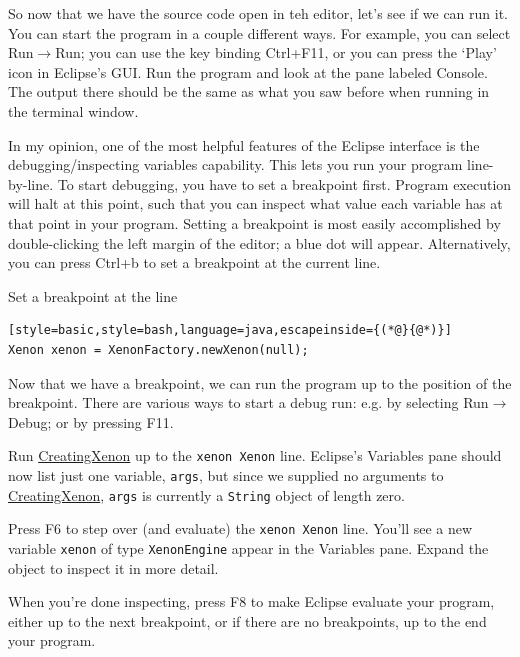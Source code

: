 \documentclass[12pt, a4paper, twoside,openany,titlepage]{article}
\begin{document}
{


So now that we have the source code open in teh editor, let's see if we can run it. You can start the program in a couple different ways. For example, you can select \textsf{Run}$\rightarrow$\textsf{Run}; you can use the key binding \textsf{Ctrl+F11}, or you can press the `Play' icon in Eclipse's GUI. Run the program and look at the pane labeled \textsf{Console}. The output there should be the same as what you saw before when running in the terminal window.


In my opinion, one of the most helpful features of the Eclipse interface is the debugging/inspecting variables capability. This lets you run your program line-by-line. To start debugging, you have to set a breakpoint first. Program execution will halt at this point, such that you can inspect what value each variable has at that point in your program. Setting a breakpoint is most easily accomplished by double-clicking the left margin of the editor; a blue dot will appear. Alternatively, you can press \textsf{Ctrl+b} to set a breakpoint at the current line.

Set a breakpoint at the line
\begin{lstlisting}[style=basic,style=bash,language=java,escapeinside={(*@}{@*)}]
Xenon xenon = XenonFactory.newXenon(null);
\end{lstlisting}

Now that we have a breakpoint, we can run the program up to the position of the breakpoint. There are various ways to start a debug run: e.g. by selecting \textsf{Run}$\rightarrow$\textsf{Debug}; or by pressing \textsf{F11}.

Run \url{CreatingXenon} up to the \texttt{xenon Xenon} line. Eclipse's \textsf{Variables} pane should now list just one variable, \texttt{args}, but since we supplied no arguments to \url{CreatingXenon}, \texttt{args} is currently a \texttt{String} object of length zero.

Press \textsf{F6} to step over (and evaluate) the \texttt{xenon Xenon} line. You'll see a new variable \texttt{xenon} of type \texttt{XenonEngine} appear in the \textsf{Variables} pane. Expand the object to inspect it in more detail.

When you're done inspecting, press \textsf{F8} to make Eclipse evaluate your program, either up to the next breakpoint, or if there are no breakpoints, up to the end your program.

}
\end{document}
